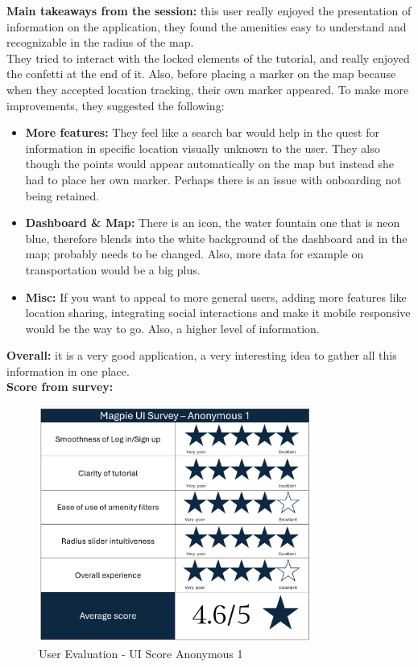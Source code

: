 \noindent\textbf{Main takeaways from the session: } this user really enjoyed the presentation of information on the application, they found the amenities easy to understand and recognizable in the radius of the map.\\
They tried to interact with the locked elements of the tutorial, and really enjoyed the confetti at the end of it. Also, before placing a marker on the map because when they accepted location tracking, their own marker appeared. To make more improvements, they suggested the following:
\begin{itemize}
    \item \textbf{More features: }They feel like a search bar would help in the quest for information in specific location visually unknown to the user. They also though the points would appear automatically on the map but instead she had to place her own marker. Perhaps there is an issue with onboarding not being retained.
    \item \textbf{Dashboard \& Map: }There is an icon, the water fountain one that is neon blue, therefore blends into the white background of the dashboard and in the map; probably needs to be changed. Also, more data for example on transportation would be a big plus.
    \item \textbf{Misc: } If you want to appeal to more general users, adding more features like location sharing, integrating social interactions and make it mobile responsive would be the way to go. Also, a higher level of information.
\end{itemize}
\textbf{Overall: }it is a very good application, a very interesting idea to gather all this information in one place.\\

\noindent\textbf{Score from survey: }
\begin{figure}[h!]
    \centering
    \includegraphics[width=0.8\textwidth]{images/survey-maira.png}
    \caption{User Evaluation - UI Score Anonymous 1}
\end{figure}

